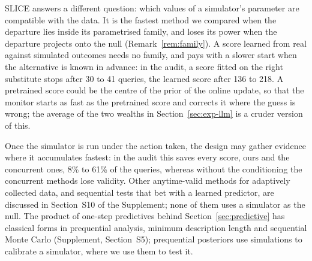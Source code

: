 \documentclass[12pt]{article}
\theoremstyle{remark}
\begin{document}
SLICE \citep{cortinovis2026slice} answers a different question: which values
of a simulator's parameter are compatible with the data. It is the fastest
method we compared when the departure lies inside its parametrised family, and
loses its power when the departure projects onto the null
(Remark~\ref{rem:family}). A score learned from real against simulated outcomes
needs no family, and pays with a slower start when the alternative is known in
advance: in the audit, a score fitted on the right substitute stops after 30 to
41 queries, the learned score after 136 to 218. A pretrained score could be the
centre of the prior of the online update, so that the monitor starts as fast as
the pretrained score and corrects it where the guess is wrong; the average of
the two wealths in Section~\ref{sec:exp-llm} is a cruder version of this.

Once the simulator is run under the action taken, the design may gather evidence where it accumulates fastest: in the audit this saves every score, ours and the concurrent ones, 8\% to 61\% of the queries, whereas without the conditioning the concurrent methods lose validity. Other anytime-valid methods for adaptively collected data, and sequential tests that bet with a learned predictor, are discussed in Section~S10 of the Supplement; none of them uses a simulator as the null. The product of one-step predictives behind
Section~\ref{sec:predictive} has classical forms in prequential analysis,
minimum description length and sequential Monte Carlo (Supplement,
Section~S5); prequential posteriors \citep{sinharoy2026prequential} use
simulations to calibrate a simulator, where we use them to test it.
\end{document}
